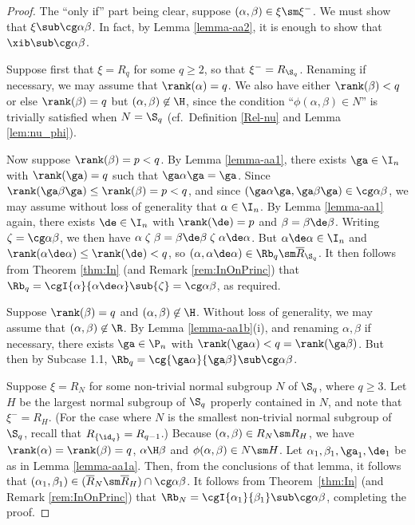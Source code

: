 \begin{proof} The ``only if'' part being clear, suppose $(\alpha,\beta)\in\xi\sm\xi^-$.  We must show that $\xi\sub\cg\alpha\beta$.  In fact, by Lemma \ref{lemma-aa2}, it is enough to show that $\xib\sub\cg\alpha\beta$.

\bigskip{}  Suppose first that $\xi=R_q$ for some $q\geq2$, so that $\xi^-=R_{\S_q}$.  Renaming if necessary, we may assume that $\rank(\alpha)=q$.  We also have either $\rank(\beta)<q$ or else $\rank(\beta)=q$ but $(\alpha,\beta)\not\in{\H}$, since the condition ``$\phi(\alpha,\beta)\in N$'' is trivially satisfied when $N=\S_q$ (cf.~Definition \ref{Rel-nu} and Lemma \ref{lem:nu_phi}).  

\bigskip{}  Now suppose $\rank(\beta)=p<q$.  By Lemma \ref{lemma-aa1}, there exists $\ga\in\I_n$ with $\rank(\ga)=q$ such that $\ga\alpha\ga=\ga$.  Since $\rank(\ga\beta\ga)\leq\rank(\beta)=p<q$, and since $(\ga\alpha\ga,\ga\beta\ga)\in\cg\alpha\beta$, we may assume without loss of generality that $\alpha\in\I_n$.  By Lemma \ref{lemma-aa1} again, there exists $\de\in\I_n$ with $\rank(\de)=p$ and $\beta=\beta\de\beta$.  Writing ${\zeta}=\cg\alpha\beta$, we then have
$\alpha \mathrel\zeta \beta = \beta\de\beta \mathrel\zeta \alpha\de\alpha$.
But $\alpha\de\alpha\in\I_n$ and $\rank(\alpha\de\alpha)\leq\rank(\de)<q$, so $(\alpha,\alpha\de\alpha)\in\Rb_q\sm\overline{R}_{\S_q}$.  It then follows from Theorem \ref{thm:In} (and Remark \ref{rem:InOnPrinc}) that $\Rb_q=\cgI{\alpha}{\alpha\de\alpha}\sub{\zeta}=\cg\alpha\beta$, as required.

\bigskip{}  Suppose $\rank(\beta)=q$ and $(\alpha,\beta)\not\in{\H}$.  Without loss of generality, we may assume that $(\alpha,\beta)\not\in{\R}$.  By Lemma \ref{lemma-aa1b}(i), and renaming $\alpha,\beta$ if necessary, there exists $\ga\in\P_n$ with $\rank(\ga\alpha)<q=\rank(\ga\beta)$.  But then by Subcase 1.1, $\Rb_q=\cg{\ga\alpha}{\ga\beta}\sub\cg\alpha\beta$.

\bigskip{}  Suppose $\xi=R_N$ for some non-trivial normal subgroup $N$ of $\S_q$, where $q\geq3$.  Let $H$ be the largest normal subgroup of $\S_q$ properly contained in $N$, and note that $\xi^-=R_H$.  (For the case where $N$ is the smallest non-trivial normal subgroup of $\S_q$, recall that $R_{\{\id_q\}}=R_{q-1}$.)  Because $(\alpha,\beta)\in R_N\sm R_H$, we have $\rank(\alpha)=\rank(\beta)=q$, $\alpha\H\beta$ and $\phi(\alpha,\beta)\in N\sm H$.  Let $\alpha_1,\beta_1,\ga_1,\de_1$ be as in Lemma \ref{lemma-aa1a}.  Then, from the conclusions of that lemma, it follows that $(\alpha_1,\beta_1)\in(\overline{R}_N\sm\overline{R}_H)\cap\cg\alpha\beta$.  It follows from Theorem~\ref{thm:In} (and Remark \ref{rem:InOnPrinc}) that $\Rb_N=\cgI{\alpha_1}{\beta_1}\sub\cg\alpha\beta$, completing the proof. \end{proof}




